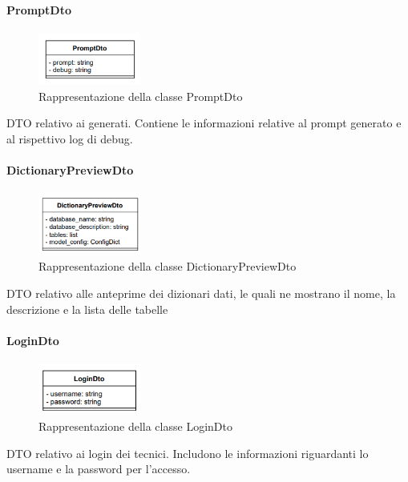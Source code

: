 \paragraph{PromptDto} \label{PromptDto}
\begin{figure}[h!]
    \centering
    \includegraphics[width=0.30\textwidth]{assets/Backend/prompt_dto.png}
    \caption{Rappresentazione della classe PromptDto}
\end{figure}
\par DTO relativo ai  generati. Contiene le informazioni relative al prompt generato e al rispettivo log di debug.

\paragraph{DictionaryPreviewDto} \label{DictionaryPreviewDto}
\begin{figure}[h!]
    \centering
    \includegraphics[width=0.30\textwidth]{assets/Backend/dictionary_preview_dto.png}
    \caption{Rappresentazione della classe DictionaryPreviewDto}
  \end{figure}
\par DTO relativo alle anteprime dei dizionari dati, le quali ne mostrano il nome, la descrizione e la lista delle tabelle

\paragraph{LoginDto} \label{LoginDto}
\begin{figure}[h!]
    \centering
    \includegraphics[width=0.30\textwidth]{assets/Backend/login_dto.png}
    \caption{Rappresentazione della classe LoginDto}
  \end{figure}
\par DTO relativo ai login dei tecnici. Includono le informazioni riguardanti lo username e la password per l'accesso.

